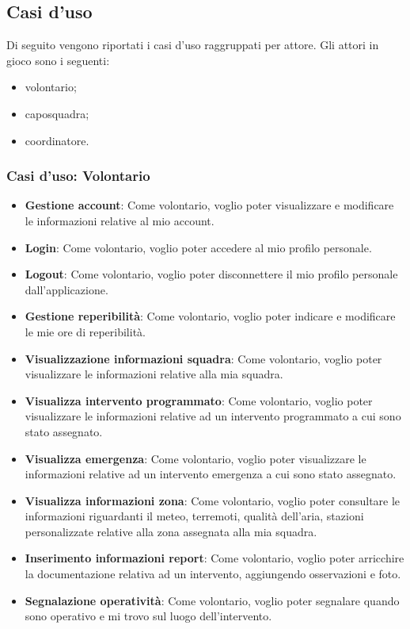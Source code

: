 \subsection{Casi d'uso}
Di seguito vengono riportati i casi d'uso raggruppati per attore. Gli attori in gioco sono i seguenti:
\begin{itemize}
	\item volontario;
	\item caposquadra;
	\item coordinatore.
\end{itemize}

\subsubsection{Casi d'uso: Volontario}
\begin{itemize}
	\item \textbf{Gestione account}:
	Come volontario, voglio poter visualizzare e modificare le informazioni relative al mio account.
	
	\item \textbf{Login}:
	Come volontario, voglio poter accedere al mio profilo personale.
	
	\item \textbf{Logout}:
	Come volontario, voglio poter disconnettere il mio profilo personale dall'applicazione.
	
	\item \textbf{Gestione reperibilità}:
	Come volontario, voglio poter indicare e modificare le mie ore di reperibilità.
	
	\item \textbf{Visualizzazione informazioni squadra}:
	Come volontario, voglio poter visualizzare le informazioni relative alla mia squadra.
	
	\item \textbf{Visualizza intervento programmato}:
	Come volontario, voglio poter visualizzare le informazioni relative ad un intervento programmato a cui sono stato assegnato.
	
	\item \textbf{Visualizza emergenza}:
	Come volontario, voglio poter visualizzare le informazioni relative ad un intervento emergenza a cui sono stato assegnato.
	
	\item \textbf{Visualizza informazioni zona}:
	Come volontario, voglio poter consultare le informazioni riguardanti il meteo, terremoti, qualità dell'aria, stazioni personalizzate relative alla zona assegnata alla mia squadra.
	
	\item \textbf{Inserimento informazioni report}:
	Come volontario, voglio poter arricchire la documentazione relativa ad un intervento, aggiungendo osservazioni e foto.
	
	\item \textbf{Segnalazione operatività}:
	Come volontario, voglio poter segnalare quando sono operativo e mi trovo sul luogo dell'intervento.
\end{itemize}




